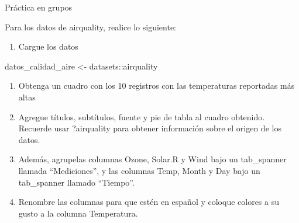\documentclass[
]{article}
\newenvironment{Shaded}{\begin{snugshade}}{\end{snugshade}}
\newcommand{\NormalTok}[1]{#1}
\newcommand{\OtherTok}[1]{\textcolor[rgb]{0.56,0.35,0.01}{#1}}
\newcommand{\SpecialCharTok}[1]{\textcolor[rgb]{0.00,0.00,0.00}{#1}}
\providecommand{\tightlist}{%
  \setlength{\itemsep}{0pt}\setlength{\parskip}{0pt}}
\begin{document}
Práctica en grupos

Para los datos de airquality, realice lo siguiente:

\begin{enumerate}
\def\labelenumi{\alph{enumi}.}
\tightlist
\item
  Cargue los datos
\end{enumerate}

\begin{Shaded}
\begin{Highlighting}[]
\NormalTok{datos\_calidad\_aire }\OtherTok{\textless{}{-}}\NormalTok{ datasets}\SpecialCharTok{::}\NormalTok{airquality}
\end{Highlighting}
\end{Shaded}

\begin{enumerate}
\def\labelenumi{\alph{enumi}.}
\setcounter{enumi}{1}
\item
  Obtenga un cuadro con los 10 registros con las temperaturas reportadas
  más altas
\item
  Agregue títulos, subtítulos, fuente y pie de tabla al cuadro obtenido.
  Recuerde usar ?airquality para obtener información sobre el origen de
  los datos.
\item
  Además, agrupelas columnas Ozone, Solar.R y Wind bajo un tab\_spanner
  llamada ``Mediciones'', y las columnas Temp, Month y Day bajo un
  tab\_spanner llamado ``Tiempo''.
\item
  Renombre las columnas para que estén en español y coloque colores a su
  gusto a la columna Temperatura.
\end{enumerate}
\end{document}
